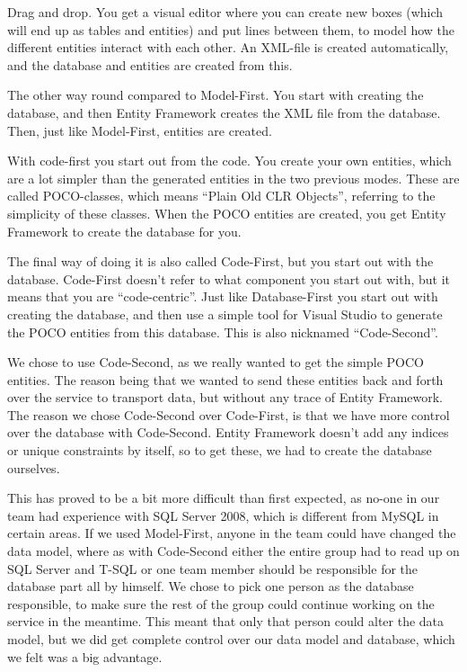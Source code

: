 \begin{my_description}
\item[Model-First] Drag and drop. You get a visual editor where you can create new boxes (which will end up as tables and entities) and put lines between them, to model how the different entities interact with each other. An XML-file is created automatically, and the database and entities are created from this.
\item[Database-First] The other way round compared to Model-First. You start with creating the database, and then Entity Framework creates the XML file from the database. Then, just like Model-First, entities are created.
\item[Code-First] With code-first you start out from the code. You create your own entities, which are a lot simpler than the generated entities in the two previous modes. These are called POCO-classes, which means ``Plain Old CLR Objects'', referring to the simplicity of these classes. When the POCO entities are created, you get Entity Framework to create the database for you.
\item[Code-First] The final way of doing it is also called Code-First, but you start out with the database. Code-First doesn't refer to what component you start out with, but it means that you are ``code-centric''. Just like Database-First you start out with creating the database, and then use a simple tool for Visual Studio to generate the POCO entities from this database. This is also nicknamed ``Code-Second''.
\end{my_description}

We chose to use Code-Second, as we really wanted to get the simple POCO entities. The reason being that we wanted to send these entities back and forth over the service to transport data, but without any trace of Entity Framework. The reason we chose Code-Second over Code-First, is that we have more control over the database with Code-Second. Entity Framework doesn't add any indices or unique constraints by itself, so to get these, we had to create the database ourselves.

This has proved to be a bit more difficult than first expected, as no-one in our team had experience with SQL Server 2008, which is different from MySQL in certain areas. If we used Model-First, anyone in the team could have changed the data model, where as with Code-Second either the entire group had to read up on SQL Server and T-SQL or one team member should be responsible for the database part all by himself. We chose to pick one person as the database responsible, to make sure the rest of the group could continue working on the service in the meantime. This meant that only that person could alter the data model, but we did get complete control over our data model and database, which we felt was a big advantage.